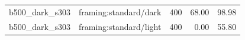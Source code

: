 \begin{longtable}{l>{\raggedright\arraybackslash}p{.42\linewidth}rrr}
b500\_\allowbreak{}dark\_\allowbreak{}s303 & %
framing:standard/dark & %
400 & %
68.00 & %
98.98 \\ %

b500\_\allowbreak{}dark\_\allowbreak{}s303 & %
framing:standard/light & %
400 & %
0.00 & %
55.80 \\ %


\end{longtable}
